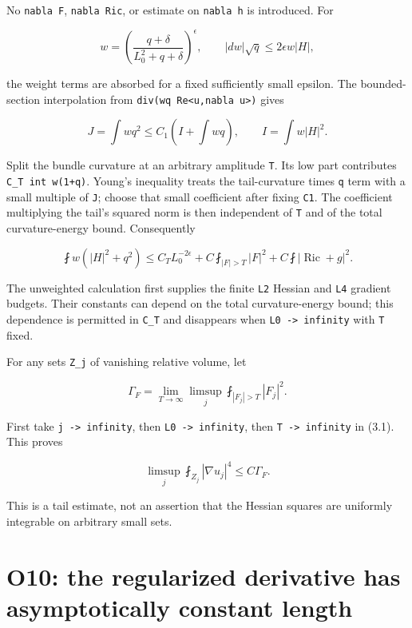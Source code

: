 \documentclass[11pt]{article}
\begin{document}
No \texttt{nabla\ F}, \texttt{nabla\ Ric}, or estimate on
\texttt{nabla\ h} is introduced. For

\[
 w=\left(\frac{q+\delta}{L_0^2+q+\delta}\right)^\epsilon,
 \qquad |dw|\sqrt q\le2\epsilon w|H|,
\]

the weight terms are absorbed for a fixed sufficiently small epsilon.
The bounded-section interpolation from
\texttt{div(wq\ Re\textless{}u,nabla\ u\textgreater{})} gives

\[
 J=\int wq^2\le C_1\left(I+\int wq\right),
 \qquad I=\int w|H|^2.
\]

Split the bundle curvature at an arbitrary amplitude \texttt{T}. Its low
part contributes \texttt{C\_\allowbreak{}T\ int\ w(1+q)}. Young's inequality treats
the tail-curvature times \texttt{q} term with a small multiple of
\texttt{J}; choose that small coefficient after fixing \texttt{C1}. The
coefficient multiplying the tail's squared norm is then independent of
\texttt{T} and of the total curvature-energy bound. Consequently

\[
 \fint w(|H|^2+q^2)
 \le C_TL_0^{-2\epsilon}
 +C\fint_{|F|>T}|F|^2+C\fint|\operatorname{Ric}+g|^2.
\tag{B.3.1}
\]

The unweighted calculation first supplies the finite \texttt{L2} Hessian
and \texttt{L4} gradient budgets. Their constants can depend on the
total curvature-energy bound; this dependence is permitted in
\texttt{C\_\allowbreak{}T} and disappears when \texttt{L0\ -\textgreater{}\ infinity}
with \texttt{T} fixed.

For any sets \texttt{Z\_\allowbreak{}j} of vanishing relative volume, let

\[
 \Gamma_F=\lim_{T\to\infty}\limsup_j\fint_{|F_j|>T}|F_j|^2.
\]

First take \texttt{j\ -\textgreater{}\ infinity}, then
\texttt{L0\ -\textgreater{}\ infinity}, then
\texttt{T\ -\textgreater{}\ infinity} in (3.1). This proves

\[
 \limsup_j\fint_{Z_j}|\nabla u_j|^4\le C\Gamma_F.
\tag{B.3.2}
\]

This is a tail estimate, not an assertion that the Hessian squares are
uniformly integrable on arbitrary small sets.
\clearpage
\hypertarget{o10-the-regularized-derivative-has-asymptotically-constant-length}{%
\section{O10: the regularized derivative has asymptotically constant
length}\label{o10-the-regularized-derivative-has-asymptotically-constant-length}}
\end{document}
